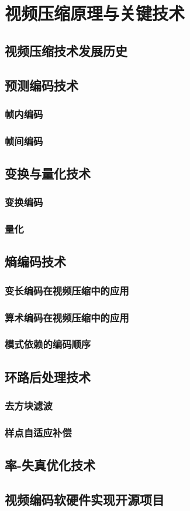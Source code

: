 \chapter{视频压缩原理与关键技术}
\label{cha:c2}

\section{视频压缩技术发展历史}

\section{预测编码技术}
\subsection{帧内编码}
\subsection{帧间编码}

\section{变换与量化技术}
\subsection{变换编码}
\subsection{量化}

\section{熵编码技术}
\subsection{变长编码在视频压缩中的应用}
\subsection{算术编码在视频压缩中的应用}
\subsection{模式依赖的编码顺序}

\section{环路后处理技术}
\subsection{去方块滤波}
\subsection{样点自适应补偿}

\section{率-失真优化技术}

\section{视频编码软硬件实现开源项目}